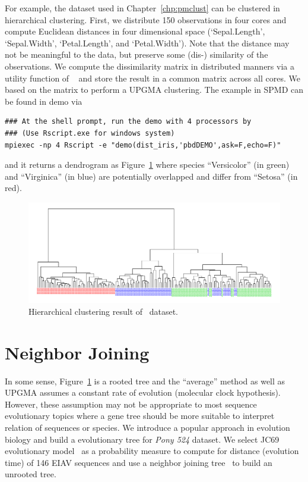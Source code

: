 For example, the  dataset used in Chapter~\ref{chp:pmclust} can be
clustered in hierarchical clustering. First, we distribute 150 observations
in four cores and compute Euclidean distances in four dimensional space
(`Sepal.Length', `Sepal.Width', `Petal.Length', and `Petal.Width').
Note that the distance may not be meaningful to the data, but preserve
some (dis-) similarity of the observations.
We compute the dissimilarity matrix in distributed manners via a
utility function 
of ~\citep{Chen2012pbdMPIpackage}
and store the result in a common matrix across all cores. We based on
the matrix to perform a UPGMA clustering. The example in SPMD can be
found in demo via
\begin{lstlisting}
### At the shell prompt, run the demo with 4 processors by
### (Use Rscript.exe for windows system)
mpiexec -np 4 Rscript -e "demo(dist_iris,'pbdDEMO',ask=F,echo=F)"
\end{lstlisting}
and it returns a dendrogram as Figure~\ref{fig:dist_iris}
where species ``Versicolor'' (in green) and ``Virginica'' (in blue)
are potentially overlapped and differ from ``Setosa'' (in red).

\begin{figure}[h!tb]
\centering
 \includegraphics[width=6.5in]{pbdDEMO-include/pics/dist_iris}
\caption{Hierarchical clustering result of \ dataset.}
\label{fig:dist_iris}
\end{figure}


\section{Neighbor Joining}

In some sense, Figure~\ref{fig:dist_iris} is a rooted tree and the
``average'' method as well as UPGMA assumes a constant rate of evolution
(molecular clock hypothesis). However, these assumption may not be
appropriate to most sequence evolutionary topics where a gene tree should
be more suitable to interpret relation of sequences or species.
We introduce a popular approach in evolution biology and build a
evolutionary tree for {\it Pony 524} dataset.
We select JC69 evolutionary model~\citep{Jukes1969} as a probability measure
to compute for distance (evolution time) of 146 EIAV sequences and
use a neighbor joining tree~\citep{Saitou1987}
to build an unrooted tree.

